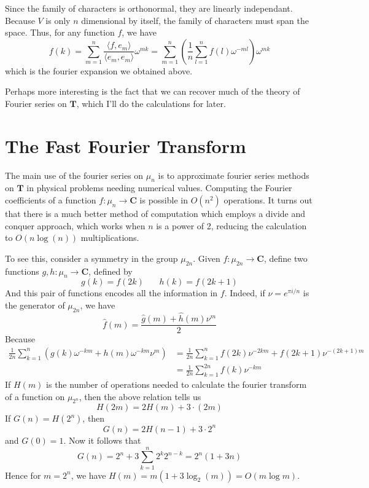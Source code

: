 Since the family of characters is orthonormal, they are linearly independant. Because $V$ is only $n$ dimensional by itself, the family of characters must span the space. Thus, for any function $f$, we have
%
\[ f(k) = \sum_{m = 1}^n \frac{\langle f, e_m \rangle}{\langle e_m, e_m \rangle} \omega^{mk} = \sum_{m = 1}^n \left( \frac{1}{n} \sum_{l = 1}^n f(l) \omega^{-ml} \right) \omega^{mk} \]
%
which is the fourier expansion we obtained above.

Perhaps more interesting is the fact that we can recover much of the theory of Fourier series on $\mathbf{T}$, which I'll do the calculations for later.

\section{The Fast Fourier Transform}

The main use of the fourier series on $\mu_n$ is to approximate fourier series methods on $\mathbf{T}$ in physical problems needing numerical values. Computing the Fourier coefficients of a function $f: \mu_n \to \mathbf{C}$ is possible in $O(n^2)$ operations. It turns out that there is a much better method of computation which employs a divide and conquer approach, which works when $n$ is a power of 2, reducing the calculation to $O(n \log(n))$ multiplications.

To see this, consider a symmetry in the group $\mu_{2n}$. Given $f: \mu_{2n} \to \mathbf{C}$, define two functions $g,h: \mu_n \to \mathbf{C}$, defined by
%
\[ g(k) = f(2k)\ \ \ \ \ \ \ \ h(k) = f(2k + 1) \]
%
And this pair of functions encodes all the information in $f$. Indeed, if $\nu = e^{\pi i/n}$ is the generator of $\mu_{2n}$, we have
%
\[ \hat{f}(m) = \frac{\hat{g}(m) + \hat{h}(m) \nu^m}{2} \]
%
Because
%
\begin{align*}
    \frac{1}{2n} \sum_{k = 1}^{n} \left( g(k) \omega^{-km} + h(m) \omega^{-km} \nu^m \right) &= \frac{1}{2n} \sum_{k = 1}^n f(2k) \nu^{-2km} + f(2k + 1) \nu^{-(2k+1)m}\\
    &= \frac{1}{2n} \sum_{k = 1}^{2n} f(k) \nu^{-km}
\end{align*}
%
If $H(m)$ is the number of operations needed to calculate the fourier transform of a function on $\mu_{2^n}$, then the above relation tells us
%
\[ H(2m) = 2H(m) + 3 \cdot (2m) \]
%
If $G(n) = H(2^n)$, then
%
\[ G(n) = 2H(n-1) + 3 \cdot 2^n \]
%
and $G(0) = 1$. Now it follows that
%
\[ G(n) = 2^n + 3 \sum_{k = 1}^n 2^{k} 2^{n-k} = 2^n(1 + 3n) \]
%
Hence for $m = 2^n$, we have $H(m) = m(1 + 3 \log_2(m)) = O(m \log m)$.

